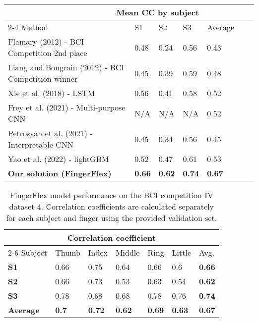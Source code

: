 \documentclass[letterpaper]{article} \usepackage{aaai22}  \usepackage{times}  \usepackage{helvet}  \usepackage{courier}  \usepackage[hyphens]{url}  \usepackage{graphicx} \urlstyle{rm} \def\UrlFont{\rm}  \usepackage{natbib}  \usepackage{caption} \DeclareCaptionStyle{ruled}{labelfont=normalfont,labelsep=colon,strut=off} \frenchspacing  \setlength{\pdfpagewidth}{8.5in}  \setlength{\pdfpageheight}{11in}  \usepackage{algorithm}
\begin{document}
\begin{table*}[h!]
  \caption{ \label{table:bcicomp_comparison} 
  Performance comparison on works solving BCI Competition IV dataset 4 finger trajectory decoding task}
  \label{table:bcicomp_comparison}
  \centering
  \begin{tabular}{lllllll}
    \toprule
    \multicolumn{4}{r}{Mean CC by subject}\\                  
    \cmidrule(r){2-4}
    Method & S1 & S2 & S3 & Average\\
    \midrule
    \midrule
    Flamary (2012) - BCI Competition 2nd place
    & 0.48 & 0.24 & 0.56  & 0.43 \\
    Liang and Bougrain (2012) - BCI Competition winner
    & 0.45 & 0.39 & 0.59 & 0.48 \\
    Xie et al. (2018) - LSTM
    & 0.56 & 0.41 & 0.58 & 0.52 \\
    Frey et al. (2021) - Multi-purpose CNN
    & N/A & N/A & N/A & 0.52 \\
    Petrosyan et al. (2021) - Interpretable CNN 
    & 0.45 & 0.34 & 0.56 & 0.45 \\
    Yao et al. (2022) - lightGBM 
    & 0.52  & 0.47 & 0.61  & 0.53 \\
    
    \textbf{Our solution (FingerFlex)} 
    & \textbf{0.66} & \textbf{0.62} & \textbf{0.74} &\textbf{0.67} \\
    \bottomrule
  \end{tabular}
\end{table*}





\begin{table}[h]
  \caption{ \label{table:bcicomp_performance} FingerFlex model performance on the BCI competition IV dataset 4. Correlation coefficients are calculated separately for each subject and finger using the provided validation set. 
  }
  \label{table:bcicomp_performance}
  
\begin{tabular}{ m{} m{} m{}  m{} m{} m{} m{} }
    \toprule
    \multicolumn{7}{c}{Correlation coefficient}\\                  
    \cmidrule(r){2-6}
    Subject & Thumb & Index & Middle & Ring & Little & Avg. \\
    \midrule
    \midrule
    \textbf{S1} & 0.66 & 0.75 & 0.64 & 0.66 & 0.6 &\textbf{0.66} \\
    \textbf{S2} & 0.66 & 0.73 & 0.53 & 0.63 & 0.54 &\textbf{0.62} \\
    \textbf{S3} & 0.78 & 0.68 & 0.68 & 0.78 & 0.76 &\textbf{0.74} \\
    \textbf{Average} & \textbf{0.7} & \textbf{0.72} & \textbf{0.62 }& \textbf{0.69} & \textbf{0.63} &\textbf{0.67} \\
    \bottomrule
  \end{tabular}
\end{table}
\end{document}
